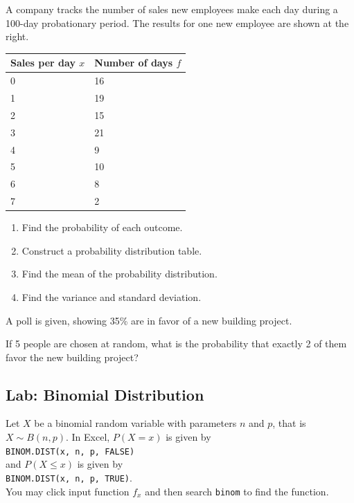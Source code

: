 \begin{exercise}

A company tracks the number of sales new employees make each day during
a 100-day probationary period. The results for one new employee are
shown at the right.

\begin{tabular}{@{}ll@{}}
  \toprule
  Sales per day \(x\) & Number of days \(f\) \\
  \midrule
  0 & 16 \\
  1 & 19 \\
  2 & 15 \\
  3 & 21 \\
  4 & 9 \\
  5 & 10 \\
  6 & 8 \\
  7 & 2 \\
  \bottomrule
  \end{tabular}

\begin{enumerate}
\item
  Find the probability of each outcome.
\item
  Construct a probability distribution table.
\item
  Find the mean of the probability distribution.
\item
  Find the variance and standard deviation.
\end{enumerate}

\end{exercise}

\begin{exercise}

A poll is given, showing 35\% are in favor of a new building project.

If 5 people are chosen at random, what is the probability that exactly 2
of them favor the new building project?

\end{exercise}
\vspace*{5\baselineskip}

\hypertarget{lab-binomial-distribution}{%
\subsection{Lab: Binomial
Distribution}\label{lab-binomial-distribution}}

Let \(X\) be a binomial random variable with parameters \(n\) and \(p\), that is \(X\sim B(n, p)\). In Excel, \(P(X=x)\) is given by\\
\texttt{BINOM.DIST(x,\ n,\ p,\ FALSE)}\\
 and \(P(X\le x)\) is given by\\
\texttt{BINOM.DIST(x,\ n,\ p,\ TRUE)}.\\
You may click input function
\(f_x\) and then search \texttt{binom} to find the function.

